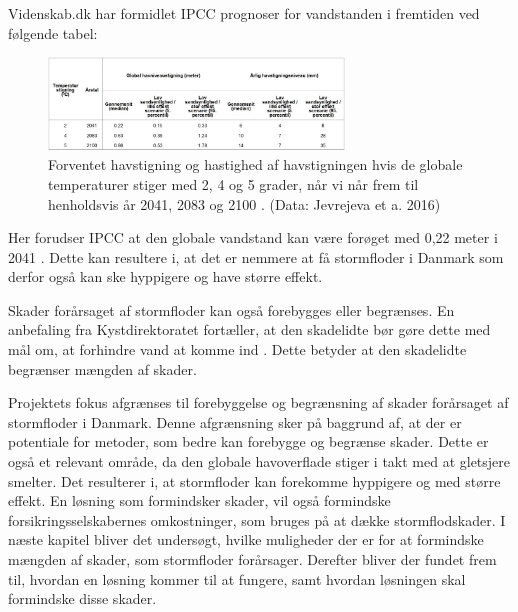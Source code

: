 Videnskab.dk har formidlet IPCC prognoser for vandstanden i fremtiden ved følgende tabel:
\begin{figure}[H]
    \centering
    \includegraphics[width=0.7\textwidth]{figures/IPCC.JPG}
    \caption{Forventet havstigning og hastighed af havstigningen hvis de globale temperaturer stiger med 2, 4 og 5 grader, når vi når frem til henholdsvis år 2041, 2083 og 2100 . (Data: Jevrejeva et a. 2016) \cite{}}
    \label{Havstigning}
\end{figure}
Her forudser IPCC at den globale vandstand kan være forøget med 0,22 meter i 2041 \cite{3f}. %
Dette kan resultere i, at det er nemmere at få stormfloder i Danmark som derfor også kan ske hyppigere og have større effekt.
\par
Skader forårsaget af stormfloder kan også forebygges eller begrænses. En anbefaling fra Kystdirektoratet fortæller, at den skadelidte bør gøre dette med mål om, at forhindre vand at komme ind \cite{3g}. Dette betyder at den skadelidte begrænser mængden af skader.

Projektets fokus afgrænses til forebyggelse og begrænsning af skader forårsaget af stormfloder i Danmark. Denne afgrænsning sker på baggrund af, at der er potentiale for metoder, som bedre kan forebygge og begrænse skader. Dette er også et relevant område, da den globale havoverflade stiger i takt med at gletsjere smelter. Det resulterer i, at stormfloder kan forekomme hyppigere og med større effekt. En løsning som formindsker skader, vil også formindske forsikringsselskabernes omkostninger, som bruges på at dække stormflodskader. I næste kapitel bliver det undersøgt, hvilke muligheder der er for at formindske mængden af skader, som stormfloder forårsager. Derefter bliver der fundet frem til, hvordan en løsning kommer til at fungere, samt hvordan løsningen skal formindske disse skader.